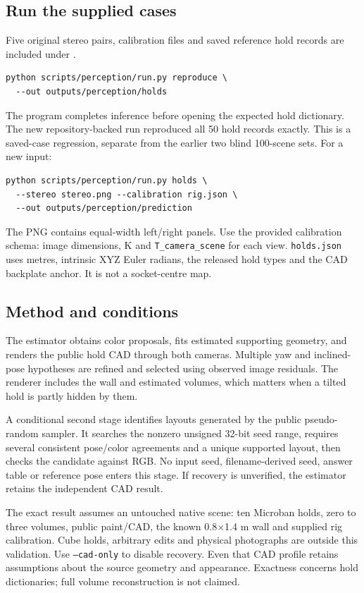 \documentclass[11pt,a4paper]{article}
\begin{document}
\subsection{Run the supplied cases}
Five original stereo pairs, calibration files and saved reference hold
records are included under .
\begin{verbatim}
python scripts/perception/run.py reproduce \
  --out outputs/perception/holds
\end{verbatim}
The program completes inference before opening the expected hold dictionary.
The new repository-backed run reproduced all 50 hold records exactly. This is
a saved-case regression, separate from the earlier two blind 100-scene sets.
For a new input:
\begin{verbatim}
python scripts/perception/run.py holds \
  --stereo stereo.png --calibration rig.json \
  --out outputs/perception/prediction
\end{verbatim}
The PNG contains equal-width left/right panels. Use the provided calibration
schema: image dimensions, K and \texttt{T\_camera\_scene} for each view.
\texttt{holds.json} uses metres, intrinsic XYZ Euler radians, the released
hold types and the CAD backplate anchor. It is not a socket-centre map.

\subsection{Method and conditions}
The estimator obtains color proposals, fits estimated supporting geometry,
and renders the public hold CAD through both cameras. Multiple yaw and
inclined-pose hypotheses are refined and selected using observed image
residuals. The renderer includes the wall and estimated volumes, which
matters when a tilted hold is partly hidden by them.

A conditional second stage identifies layouts generated by the public
pseudo-random sampler. It searches the nonzero unsigned 32-bit seed range,
requires several consistent pose/color agreements and a unique supported
layout, then checks the candidate against RGB. No input seed, filename-derived
seed, answer table or reference pose enters this stage. If recovery is
unverified, the estimator retains the independent CAD result.

The exact result assumes an untouched native scene: ten Microban holds,
zero to three volumes, public paint/CAD, the known 0.8$\times$1.4 m wall and
supplied rig calibration. Cube holds, arbitrary edits and physical photographs
are outside this validation. Use \texttt{--cad-only} to disable recovery.
Even that CAD profile retains assumptions about the source geometry and
appearance. Exactness concerns hold dictionaries; full volume reconstruction
is not claimed.
\end{document}
